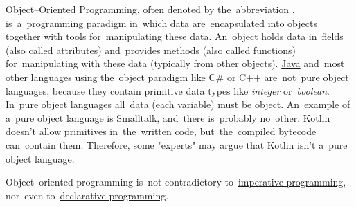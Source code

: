 \label{objectorientedprogramming}

Object--Oriented Programming, often denoted by the~abbreviation , is~a~programming paradigm in~which data are~encapsulated into objects together with tools for~manipulating these data.
An~object holds data in~fields (also called attributes) and~provides methods (also called functions) for~manipulating with these data (typically from other objects).
\hyperref[java]{Java} and~most other languages using the~object paradigm like C\# or C++ are~not~pure object languages, because they contain \hyperref[javaprimitivetypes]{primitive} \hyperref[datatypes]{data types} like \textit{integer} or~\textit{boolean}.
In~pure object languages all~data (each variable) must be object.
An~example of a~pure object language is Smalltalk, and~there is~probably no~other.
\hyperref[kotlin]{Kotlin} doesn't allow primitives in~the~written code, but~the~compiled \hyperref[javabytecode]{bytecode} can~contain them.
Therefore, some "experts" may argue that Kotlin isn't a~pure object language.

\warning Object--oriented programming is~not contradictory to~\hyperref[imperativeprogramming]{imperative programming}, nor~even to~\hyperref[declarativeprogramming]{declarative programming}.

